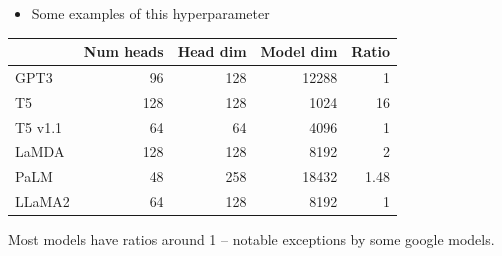 \begin{itemize}
  \item Some examples of this hyperparameter
\end{itemize}
\medskip
\begin{center}
\begin{tabular}{@{}lrrrr@{}}
\toprule
 & \textbf{Num heads} & \textbf{Head dim} & \textbf{Model dim} & \textbf{Ratio}\\
\midrule
GPT3 & 96 & 128 & 12288 & 1\\
T5 & 128 & 128 & 1024 & 16\\
T5 v1.1 & 64 & 64 & 4096 & 1\\
LaMDA & 128 & 128 & 8192 & 2\\
PaLM & 48 & 258 & 18432 & 1.48\\
LLaMA2 & 64 & 128 & 8192 & 1\\
\bottomrule
\end{tabular}
\end{center}
\medskip
Most models have ratios around 1 -- notable exceptions by some google models.
